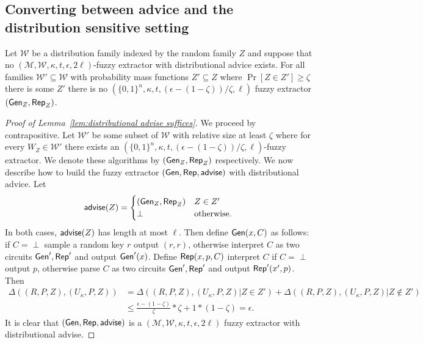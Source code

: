 \subsection{Converting between advice and the distribution sensitive setting}
\begin{lemma}

Let $\mathcal{W}$ be a distribution family indexed by the random family $Z$ and suppose that no $(\mathcal{M}, \mathcal{W}, \kappa, t, \epsilon, 2\ell)$-fuzzy extractor with distributional advice exists.  For all families $\mathcal{W}'\subseteq \mathcal{W}$ with probability mass functions $Z'\subseteq Z$ where $\Pr[Z\in Z']\ge \zeta$ there is some $Z'$ there is no  $(\{0,1\}^n,\kappa, t, (\epsilon-(1-\zeta))/\zeta, \ell)$ fuzzy extractor $({\mathsf{Gen}}_Z, {\mathsf{Rep}}_Z)$.
\label{lem:distributional advise suffices}
\end{lemma}
\begin{proof}[Proof of Lemma~\ref{lem:distributional advise suffices}]
We proceed by contrapositive.  Let $\mathcal{W}'$ be some subset of $\mathcal{W}$ with relative size at least $\zeta$ where  for every $W_Z\in\mathcal{W}'$ there exists an $(\{0,1\}^n,\kappa, t, (\epsilon-(1-\zeta))/\zeta, \ell)$-fuzzy extractor.  We denote these algorithms by $({\mathsf{Gen}}_Z, {\mathsf{Rep}}_Z)$ respectively.  We now describe how to build the fuzzy extractor $({\mathsf{Gen}}, {\mathsf{Rep}}, {\mathsf{advise}})$ with distributional advice.  Let 
\[
{\mathsf{advise}}(Z) = \begin{cases} ({\mathsf{Gen}}_Z, {\mathsf{Rep}}_Z)& Z\in Z'\\\perp&\text{otherwise.}\end{cases}
\]
In both cases, ${\mathsf{advise}}(Z)$ has length at most $\ell$. Then define ${\mathsf{Gen}}(x, C)$ as follows:  if $C = \perp$ sample a random key $r$ output $(r, r)$, otherwise interpret $C$ as two circuits ${\mathsf{Gen}}', {\mathsf{Rep}}'$ and output ${\mathsf{Gen}}'(x)$.  Define ${\mathsf{Rep}}(x, p, C)$ interpret $C$ if $C = \perp$ output $p$, otherwise parse $C$ as two circuits ${\mathsf{Gen}}', {\mathsf{Rep}}'$ and output ${\mathsf{Rep}}'(x', p)$.  
Then 
\begin{align*}
\Delta((R, P, Z), (U_\kappa, P, Z)) &= \Delta((R, P, Z), (U_\kappa, P, Z) | Z\in Z')+\Delta((R, P, Z), (U_\kappa, P, Z) | Z\not\in Z')\\
&\le \frac{\epsilon-(1-\zeta)}{\zeta} * \zeta + 1* (1-\zeta) = \epsilon.
\end{align*}
It is clear that $({\mathsf{Gen}}, {\mathsf{Rep}}, {\mathsf{advise}})$ is a $(\mathcal{M}, \mathcal{W}, \kappa, t, \epsilon, 2\ell)$ fuzzy extractor with distributional advise.
\end{proof}

